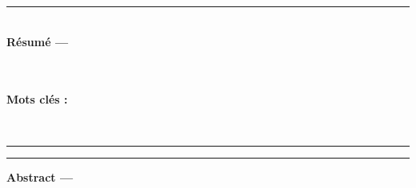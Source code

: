 \begin{vcenterpage}
\noindent\rule[2pt]{\textwidth}{0.5pt}
\\
{\large\textbf{Résumé ---}}

\\
\\
{\large\textbf{Mots clés :}}

\\
\noindent\rule[2pt]{\textwidth}{0.5pt}
\vspace{0.5cm}
\newpage
\noindent\rule[2pt]{\textwidth}{0.5pt}
{\large\textbf{Abstract ---}}

\\
\\
	

    



\end{vcenterpage}
